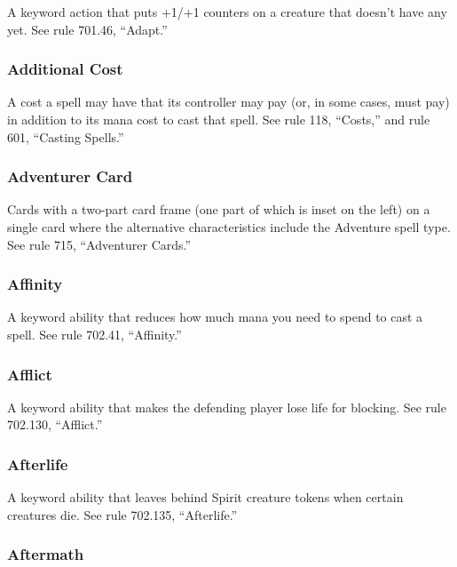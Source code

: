 A keyword action that puts +1/+1 counters on a creature that doesn’t have any yet. See rule 701.46, “Adapt.”

\subsubsection*{Additional Cost}

A cost a spell may have that its controller may pay (or, in some cases, must pay) in addition to its mana cost to cast that spell. See rule 118, “Costs,” and rule 601, “Casting Spells.”

\subsubsection*{Adventurer Card}

Cards with a two-part card frame (one part of which is inset on the left) on a single card where the alternative characteristics include the Adventure spell type. See rule 715, “Adventurer Cards.”

\subsubsection*{Affinity}

A keyword ability that reduces how much mana you need to spend to cast a spell. See rule 702.41, “Affinity.”

\subsubsection*{Afflict}

A keyword ability that makes the defending player lose life for blocking. See rule 702.130, “Afflict.”

\subsubsection*{Afterlife}

A keyword ability that leaves behind Spirit creature tokens when certain creatures die. See rule 702.135, “Afterlife.”

\subsubsection*{Aftermath}

